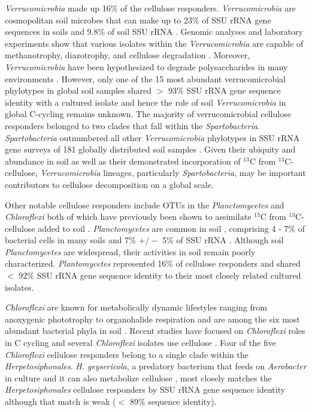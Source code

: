\textit{Verrucomicrobia} made up 16\% of the cellulose responders.
\textit{Verrucomicrobia} are cosmopolitan soil microbes \citep{Bergmann_2011}
that can make up to 23\% of SSU rRNA gene sequences in soils
\citep{Bergmann_2011} and 9.8\% of soil SSU rRNA \citep{Buckley_2001}. Genomic
analyses and laboratory experiments show that various isolates
within the \textit{Verrucomicrobia} are capable of methanotrophy, diazotrophy,
and cellulose degradation \citep{Wertz_2011,Otsuka_2012}. Moreover,
\textit{Verrucomicrobia} have been hypothesized to degrade polysaccharides in
many environments \citep{Fierer_2013,10543821,Herlemann_2013}. However, only
one of the 15 most abundant verrucomicrobial phylotypes in global soil samples
shared $>$ 93\% SSU rRNA gene sequence identity with
a cultured isolate \citep{Bergmann_2011} and hence the role of soil
\textit{Verrucomicrobia} in global C-cycling remains unknown. The majority of
verrucomicrobial cellulose responders belonged to two clades that fall
within the \textit{Spartobacteria}. \textit{Spartobacteria} outnumbered
all other \textit{Verrucomicrobia} phylotypes in SSU rRNA gene surveys of
181 globally distributed soil samples \citep{Bergmann_2011}. Given their ubiquity and abundance
in soil as well as their demonstrated incorporation of $^{13}$C from
$^{13}$C-cellulose, \textit{Verrucomicrobia} lineages, particularly
\textit{Spartobacteria}, may be important contributors to cellulose
decomposition on a global scale. 

Other notable cellulose responders include OTUs in the \textit{Planctomycetes}
and \textit{Chloroflexi} both of which have previously been shown to
assimilate $^{13}$C from $^{13}$C-cellulose added to soil
\citep{Schellenberger_2010}. \textit{Planctomycetes} are common in soil
\citep{Janssen2006}, comprising 4 - 7\% of bacterial cells in many soils
\citep{Zarda_1997,Chatzinotas_1998} and 7\% $+/-$ 5\% of SSU rRNA
\citep{buckley_2003}. Although soil \textit{Planctomycetes} are widespread,
their activities in soil remain poorly characterized. \textit{Plantomycetes}
represented 16\% of cellulose responders and shared $<$ 92\% SSU rRNA gene
sequence identity to their most closely related cultured isolates.

\textit{Chloroflexi} are known for metabolically dynamic lifestyles ranging
from anoxygenic phototrophy to organohalide respiration \citep{Hug_2013} and
are among the six most abundant bacterial phyla in soil \citep{Janssen2006}.
Recent studies have focused on \textit{Chloroflexi} roles in C cycling
\citep{Hug_2013,Goldfarb_2011,Cole_2013} and several \textit{Chloroflexi}
isolates use cellulose \citep{Hug_2013,Goldfarb_2011,Cole_2013}. Four
of the five \textit{Chloroflexi} cellulose responders belong to a single clade
within the \textit{Herpetosiphonales}. \textit{H. geysericola}, a predatory
bacterium that feeds on \textit{Aerobacter} in culture and it can also
metabolize cellulose \citep{Lewin1970},  most closely matches the \textit{Herpetosiphonales}
cellulose responders by SSU rRNA gene sequence identity although that match is
weak ($<$ 89\% sequence identity).
 

